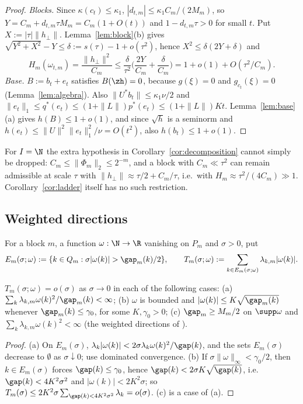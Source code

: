 \begin{proof}
\emph{Blocks.}  Since $\kappa(c_t)\le\kappa_1$, $|d_{t,m}|\le
\kappa_1C_m/(2M_m)$, so $Y=C_m+d_{t,m}\tau M_m=C_m(1+O(t))$ and
$1-d_{t,m}\tau>0$ for small $t$.  Put $X:=|\tau|\|h_\perp\|$.
Lemma~\ref{lem:block}(b) gives $\sqrt{Y^2+X^2}-Y\le\delta:=s(\tau)-1+o(\tau^2)$,
hence $X^2\le\delta(2Y+\delta)$ and
\[
 H_m(\omega_{t,m})=\frac{\|h_\perp\|^2}{C_m}\le\frac\delta{\tau^2}
 \Big(\frac{2Y}{C_m}+\frac\delta{C_m}\Big)=1+o(1)+O(\tau^2/C_m).
\]
\emph{Base.}  $B:=b_t+e_t$ satisfies $B(\zh)=0$, because $g(\xi)=0$ and
$g_{c_t}(\xi)=0$ (Lemma~\ref{lem:algebra}).  Also $\|U^*b_t\|\le
\kappa_1\nu/2$ and $\|e_t\|_1\le q^*(e_t)\le(1+\|L\|)p^*(e_t)\le(1+\|L\|)Kt$.
Lemma~\ref{lem:base}(a) gives $h(B)\le1+o(1)$, and since $\sqrt h$ is a
seminorm and $h(e_t)\le\|U\|^2\|e_t\|_1^2/\nu=O(t^2)$, also $h(b_t)\le
1+o(1)$.
\end{proof}

\begin{remark}\label{rem:G2}
For $I=\N$ the extra hypothesis in Corollary~\ref{cor:decomposition} cannot
simply be dropped: $C_m\le\|\Phi_m\|_2\le2^{-m}$, and a block with
$C_m\ll\tau^2$ can remain admissible at scale $\tau$ with
$\|h_\perp\|\approx\tau/2+C_m/\tau$, i.e.\ with $H_m\approx\tau^2/(4C_m)\gg1$.
Corollary~\ref{cor:ladder} itself has no such restriction.
\end{remark}

\subsection{Weighted directions}
For a block $m$, a function $\omega:\N\to\R$ vanishing on $P_m$ and
$\sigma>0$, put
\[
 E_m(\sigma;\omega):=\{k\in Q_m:\sigma|\omega(k)|>\gap_m(k)/2\},\qquad
 T_m(\sigma;\omega):=\sum_{k\in E_m(\sigma;\omega)}\lambda_{k,m}|\omega(k)|.
\]

\begin{lemma}\label{lem:boxtails}
$T_m(\sigma;\omega)=o(\sigma)$ as $\sigma\to0$ in each of the following cases:
\textup{(a)} $\sum_k\lambda_{k,m}\omega(k)^2/\gap_m(k)<\infty$;
\textup{(b)} $\omega$ is bounded and $|\omega(k)|\le K\sqrt{\gap_m(k)}$
whenever $\gap_m(k)\le\gamma_0$, for some $K,\gamma_0>0$;
\textup{(c)} $\gap_m\ge M_m/2$ on $\supp\omega$ and
$\sum_k\lambda_{k,m}\omega(k)^2<\infty$ \textup{(}the weighted directions
of \cite[Theorem~3.1]{PrA}\textup{)}.
\end{lemma}

\begin{proof}
(a) On $E_m(\sigma)$, $\lambda_k|\omega(k)|<2\sigma\lambda_k\omega(k)^2/
\gap(k)$, and the sets $E_m(\sigma)$ decrease to $\emptyset$ as
$\sigma\downarrow0$; use dominated convergence.  (b) If
$\sigma\|\omega\|_\infty<\gamma_0/2$, then $k\in E_m(\sigma)$ forces
$\gap(k)\le\gamma_0$, hence $\gap(k)<2\sigma K\sqrt{\gap(k)}$, i.e.\
$\gap(k)<4K^2\sigma^2$ and $|\omega(k)|<2K^2\sigma$; so $T_m(\sigma)\le
2K^2\sigma\sum_{\gap(k)<4K^2\sigma^2}\lambda_k=o(\sigma)$.  (c) is a case
of (a).
\end{proof}

